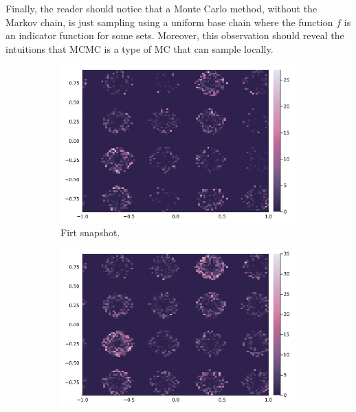 \documentclass[]{article}
\theoremstyle{definition}
\begin{document}
        \par
        Finally, the reader should notice that a Monte Carlo method, without the Markov chain, is just sampling using a uniform base chain where the function $f$ is an indicator function for some sets. Moreover, this observation should reveal the intuitions that MCMC is a type of MC that can sample locally. 
        \begin{figure}[H]
            \centering
            \begin{subfigure}{0.3\textwidth}
                \includegraphics[width=\textwidth]{gaussian_base(1).png}
                \caption{Firt snapshot.}
            \end{subfigure}
            \hfill
            \begin{subfigure}{0.3\textwidth}
                \includegraphics[width=\textwidth]{gaussian_base(2).png}

\end{subfigure}
\end{figure}
\end{document}
